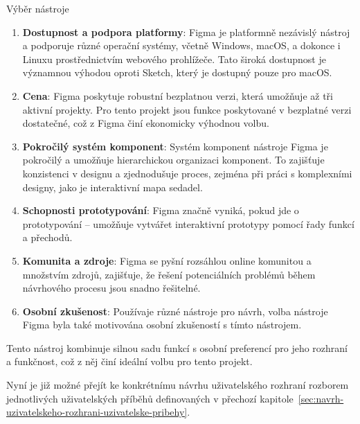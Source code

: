 \begin{subsection}{Výběr nástroje}
    \begin{enumerate}
        \item \textbf{Dostupnost a podpora platformy}: Figma je platformně nezávislý nástroj a podporuje různé operační systémy, včetně Windows, macOS, a dokonce i Linuxu prostřednictvím webového prohlížeče.
        Tato široká dostupnost je významnou výhodou oproti Sketch, který je dostupný pouze pro macOS\@.
        \item \textbf{Cena}: Figma poskytuje robustní bezplatnou verzi, která umožňuje až tři aktivní projekty.
        Pro tento projekt jsou funkce poskytované v bezplatné verzi dostatečné, což z Figma činí ekonomicky výhodnou volbu.
        \item \textbf{Pokročilý systém komponent}: Systém komponent nástroje Figma je pokročilý a umožňuje hierarchickou organizaci komponent.
        To zajišťuje konzistenci v designu a zjednodušuje proces, zejména při práci s komplexními designy, jako je interaktivní mapa sedadel.
        \item \textbf{Schopnosti prototypování}: Figma značně vyniká, pokud jde o prototypování – umožňuje vytvářet interaktivní prototypy pomocí řady funkcí a přechodů.
        \item \textbf{Komunita a zdroje}: Figma se pyšní rozsáhlou online komunitou a množstvím zdrojů, zajišťuje, že řešení potenciálních problémů během návrhového procesu jsou snadno řešitelné.
        \item \textbf{Osobní zkušenost}: Používaje různé nástroje pro návrh, volba nástroje Figma byla také motivována osobní zkušeností s tímto nástrojem.
    \end{enumerate}

    Tento nástroj kombinuje silnou sadu funkcí s osobní preferencí pro jeho rozhraní a funkčnost, což z něj činí ideální volbu pro tento projekt.

    Nyní je již možné přejít ke konkrétnímu návrhu uživatelského rozhraní rozborem jednotlivých uživatelských příběhů definovaných v přechozí kapitole~\ref{sec:navrh-uzivatelskeho-rozhrani-uzivatelske-pribehy}.
\end{subsection}
